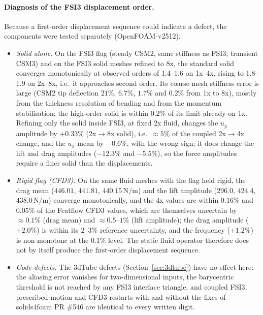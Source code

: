 \paragraph{Diagnosis of the FSI3 displacement order.}
Because a first-order displacement sequence could indicate a defect, the components were tested separately (OpenFOAM-v2512).
\begin{itemize}
	\item \emph{Solid alone.} On the FSI3 flag (steady CSM2, same stiffness as FSI3; transient CSM3) and on the FSI3 solid meshes refined to 8x, the standard solid converges monotonically at observed orders of 1.4--1.6 on 1x--4x, rising to 1.8--1.9 on 2x--8x, i.e.\ it approaches second order. Its coarse-mesh stiffness error is large (CSM2 tip deflection $21\%$, $6.7\%$, $1.7\%$ and $0.2\%$ from 1x to 8x), mostly from the thickness resolution of bending and from the momentum stabilisation; the high-order solid is within $0.2\%$ of its limit already on 1x. Refining only the solid inside FSI3, at fixed 2x fluid, changes the $u_y$ amplitude by $+0.33\%$ (2x$\to$8x solid), i.e.\ $\approx5\%$ of the coupled 2x$\to$4x change, and the $u_x$ mean by $-0.6\%$, with the wrong sign; it does change the lift and drag amplitudes ($-12.3\%$ and $-5.5\%$), so the force amplitudes require a finer solid than the displacements.
	\item \emph{Rigid flag (CFD3).} On the same fluid meshes with the flag held rigid, the drag mean ($446.01$, $441.81$, $440.15\,\mathrm{N/m}$) and the lift amplitude ($296.0$, $424.4$, $438.0\,\mathrm{N/m}$) converge monotonically, and the 4x values are within $0.16\%$ and $0.05\%$ of the Featflow CFD3 values, which are themselves uncertain by $\approx0.1\%$ (drag mean) and $\approx0.5$--$1\%$ (lift amplitude); the drag amplitude ($+2.0\%$) is within its $2$--$3\%$ reference uncertainty, and the frequency ($+1.2\%$) is non-monotone at the $0.1\%$ level. The static fluid operator therefore does not by itself produce the first-order displacement sequence.
	\item \emph{Code defects.} The 3dTube defects (Section~\ref{sec:3dtube}) have no effect here: the aliasing error vanishes for two-dimensional inputs, the barycentric threshold is not reached by any FSI3 interface triangle, and coupled FSI3, prescribed-motion and CFD3 restarts with and without the fixes of solids4foam PR \#546 are identical to every written digit.

\end{itemize}
